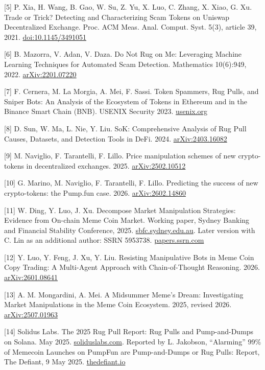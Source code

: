 {[}5{]} P. Xia, H. Wang, B. Gao, W. Su, Z. Yu, X. Luo, C. Zhang, X. Xiao, G. Xu. Trade or Trick? Detecting and Characterizing Scam Tokens on Uniswap Decentralized Exchange. Proc. ACM Meas. Anal. Comput. Syst. 5(3), article 39, 2021. \href{https://doi.org/10.1145/3491051}{doi:10.1145/3491051}

{[}6{]} B. Mazorra, V. Adan, V. Daza. Do Not Rug on Me: Leveraging Machine Learning Techniques for Automated Scam Detection. Mathematics 10(6):949, 2022. \href{https://arxiv.org/abs/2201.07220}{arXiv:2201.07220}

{[}7{]} F. Cernera, M. La Morgia, A. Mei, F. Sassi. Token Spammers, Rug Pulls, and Sniper Bots: An Analysis of the Ecosystem of Tokens in Ethereum and in the Binance Smart Chain (BNB). USENIX Security 2023. \href{https://www.usenix.org/conference/usenixsecurity23/presentation/cernera}{usenix.org}

{[}8{]} D. Sun, W. Ma, L. Nie, Y. Liu. SoK: Comprehensive Analysis of Rug Pull Causes, Datasets, and Detection Tools in DeFi. 2024. \href{https://arxiv.org/abs/2403.16082}{arXiv:2403.16082}

{[}9{]} M. Naviglio, F. Tarantelli, F. Lillo. Price manipulation schemes of new crypto-tokens in decentralized exchanges. 2025. \href{https://arxiv.org/abs/2502.10512}{arXiv:2502.10512}

{[}10{]} G. Marino, M. Naviglio, F. Tarantelli, F. Lillo. Predicting the success of new crypto-tokens: the Pump.fun case. 2026. \href{https://arxiv.org/abs/2602.14860}{arXiv:2602.14860}

{[}11{]} W. Ding, Y. Luo, J. Xu. Decompose Market Manipulation Strategies: Evidence from On-chain Meme Coin Market. Working paper, Sydney Banking and Financial Stability Conference, 2025. \href{https://sbfc.sydney.edu.au/2025/papers/SBFC2025_4G3_P154.pdf}{sbfc.sydney.edu.au}. Later version with C. Lin as an additional author: SSRN 5953738. \href{https://papers.ssrn.com/abstract=5953738}{papers.ssrn.com}

{[}12{]} Y. Luo, Y. Feng, J. Xu, Y. Liu. Resisting Manipulative Bots in Meme Coin Copy Trading: A Multi-Agent Approach with Chain-of-Thought Reasoning. 2026. \href{https://arxiv.org/abs/2601.08641}{arXiv:2601.08641}

{[}13{]} A. M. Mongardini, A. Mei. A Midsummer Meme's Dream: Investigating Market Manipulations in the Meme Coin Ecosystem. 2025, revised 2026. \href{https://arxiv.org/abs/2507.01963}{arXiv:2507.01963}

{[}14{]} Solidus Labs. The 2025 Rug Pull Report: Rug Pulls and Pump-and-Dumps on Solana. May 2025. \href{https://www.soliduslabs.com/reports/solana-rug-pulls-pump-dumps-crypto-compliance}{soliduslabs.com}. Reported by L. Jakobson, ``Alarming'' 99\% of Memecoin Launches on PumpFun are Pump-and-Dumps or Rug Pulls: Report, The Defiant, 9 May 2025. \href{https://thedefiant.io/news/defi/alarming-99-of-memecoin-launches-on-pumpfun-are-pump-and-dumps-or-rug-pulls-report}{thedefiant.io}

